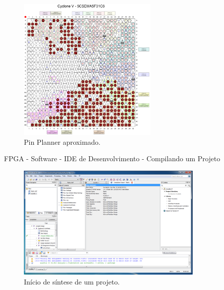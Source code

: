 \documentclass[aspectratio=169]{beamer}
\begin{document}
	\begin{frame}%
		\begin{figure}[p]
			\centering
			\includegraphics[width=0.6\textwidth]{img/fpga/pinplanner.png}
			\caption{Pin Planner aproximado.}
			\label{fig:pinplanner}
		\end{figure}
	\end{frame}
	
	\begin{frame}{FPGA - Software - IDE de Desenvolvimento - Compilando um Projeto}
		\begin{figure}[p]
			\centering
			\includegraphics[width=0.8\textwidth]{img/fpga/software_quartus_compilation0.png}
			\caption{Início de síntese de um projeto.}
			\label{fig:alteraquartus_comp0}
		\end{figure}
	\end{frame}
	
\end{document}
